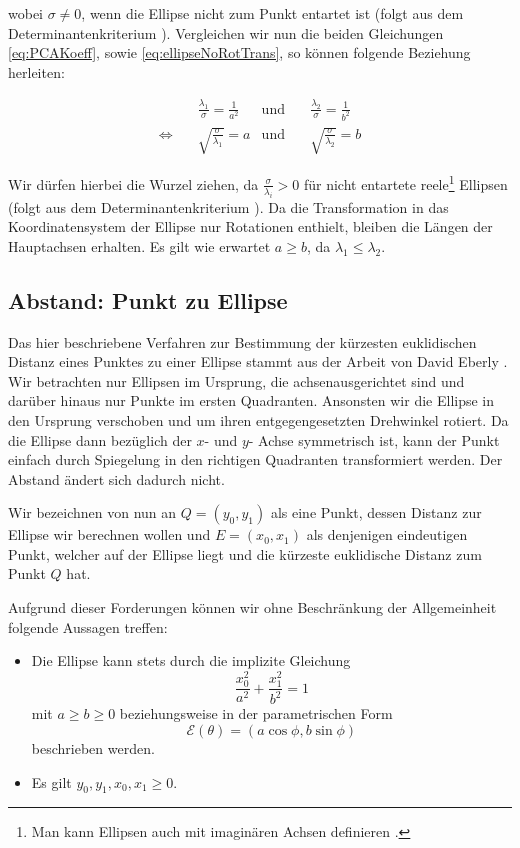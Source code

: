 wobei $\sigma \neq 0$, wenn die Ellipse nicht zum Punkt entartet ist (folgt aus dem Determinantenkriterium \cite{Lawrence1972}). Vergleichen wir nun die beiden Gleichungen \ref{eq:PCAKoeff}, sowie \ref{eq:ellipseNoRotTrans}, so können folgende Beziehung herleiten: 

\begin{equation}
\begin{aligned}
&\frac{\lambda_1}{\sigma} = \frac{1}{a^2} &\text{und}\quad &\frac{\lambda_2}{\sigma} = \frac{1}{b^2}\\
\Leftrightarrow\quad & \sqrt{\frac{\sigma}{\lambda_1}}  = a  &\text{und}\quad & \sqrt{\frac{\sigma}{\lambda_2}}  = b
\end{aligned}
\end{equation}

Wir dürfen hierbei die Wurzel ziehen, da $\frac{\sigma}{\lambda_i} > 0$ für nicht entartete reele\footnote{Man kann Ellipsen auch mit imaginären Achsen definieren \cite{Lawrence1972}.}  Ellipsen (folgt aus dem Determinantenkriterium \cite{Lawrence1972}). Da die Transformation in das Koordinatensystem der Ellipse nur Rotationen enthielt,  bleiben die Längen der Hauptachsen erhalten. Es gilt wie erwartet $a \geq b$, da $\lambda_1 \leq \lambda_2$. 


\subsection{Abstand: Punkt zu Ellipse}
\label{sc:distPointEllipse}
Das hier beschriebene Verfahren zur Bestimmung der kürzesten euklidischen Distanz eines Punktes zu einer Ellipse stammt aus der Arbeit von David Eberly \cite{Eberly2013}.
Wir betrachten nur Ellipsen im Ursprung, die achsenausgerichtet sind und darüber hinaus nur Punkte im ersten Quadranten. Ansonsten wir die Ellipse in den Ursprung verschoben und um ihren entgegengesetzten Drehwinkel rotiert. Da die Ellipse dann bezüglich der $x$- und $y$- Achse symmetrisch ist, kann der Punkt einfach durch Spiegelung in den richtigen Quadranten transformiert werden. Der Abstand ändert sich dadurch nicht. 

Wir bezeichnen von nun an $Q = (y_0, y_1)$ als eine Punkt, dessen Distanz zur Ellipse wir berechnen wollen und $E = (x_0, x_1)$ als denjenigen eindeutigen Punkt, welcher auf der Ellipse liegt und die kürzeste euklidische Distanz zum Punkt $Q$ hat. 

Aufgrund dieser Forderungen können wir ohne Beschränkung der Allgemeinheit folgende Aussagen treffen:
\begin{itemize}
	\item Die Ellipse kann stets durch die implizite Gleichung 
	\begin{equation}\label{eq:distEqParam} \frac{x_0^2}{a^2} + \frac{x_1^2}{b^2} = 1\end{equation}
	 mit $a \geq b \geq 0$ beziehungsweise
	in der parametrischen Form \[\mathcal{E}(\theta) = (a\cos\phi, b\sin\phi)  \tag*{$\phi \in [0, 2\pi)$}\] beschrieben werden.
	\item Es gilt $y_0,y_1,x_0, x_1 \geq 0$.
\end{itemize}

